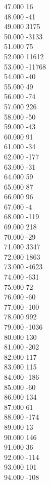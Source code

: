{ 47.000	16 \\
 48.000	-41 \\
 49.000	3175 \\
 50.000	-3133 \\
 51.000	75 \\
 52.000	11612 \\
 53.000	-11768 \\
 54.000	-40 \\
 55.000	49 \\
 56.000	-74 \\
 57.000	226 \\
 58.000	-50 \\
 59.000	-43 \\
 60.000	91 \\
 61.000	-34 \\
 62.000	-177 \\
 63.000	-31 \\
 64.000	59 \\
 65.000	87 \\
 66.000	96 \\
 67.000	-4 \\
 68.000	-119 \\
 69.000	218 \\
 70.000	-29 \\
 71.000	3347 \\
 72.000	1863 \\
 73.000	-4623 \\
 74.000	-631 \\
 75.000	72 \\
 76.000	-60 \\
 77.000	-100 \\
 78.000	992 \\
 79.000	-1036 \\
 80.000	130 \\
 81.000	-202 \\
 82.000	117 \\
 83.000	115 \\
 84.000	-186 \\
 85.000	-60 \\
 86.000	134 \\
 87.000	61 \\
 88.000	-174 \\
 89.000	13 \\
 90.000	146 \\
 91.000	36 \\
 92.000	-114 \\
 93.000	101 \\
 94.000	-108 \\
}
